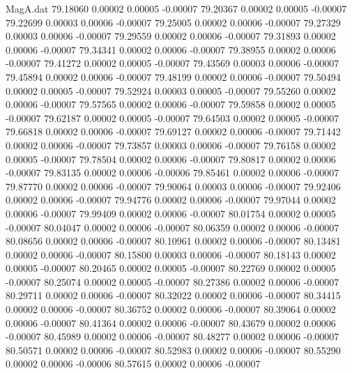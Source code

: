 \begin{filecontents}{MagA.dat}
  79.18060    0.00002    0.00005   -0.00007
  79.20367    0.00002    0.00005   -0.00007
  79.22699    0.00003    0.00006   -0.00007
  79.25005    0.00002    0.00006   -0.00007
  79.27329    0.00003    0.00006   -0.00007
  79.29559    0.00002    0.00006   -0.00007
  79.31893    0.00002    0.00006   -0.00007
  79.34341    0.00002    0.00006   -0.00007
  79.38955    0.00002    0.00006   -0.00007
  79.41272    0.00002    0.00005   -0.00007
  79.43569    0.00003    0.00006   -0.00007
  79.45894    0.00002    0.00006   -0.00007
  79.48199    0.00002    0.00006   -0.00007
  79.50494    0.00002    0.00005   -0.00007
  79.52924    0.00003    0.00005   -0.00007
  79.55260    0.00002    0.00006   -0.00007
  79.57565    0.00002    0.00006   -0.00007
  79.59858    0.00002    0.00005   -0.00007
  79.62187    0.00002    0.00005   -0.00007
  79.64503    0.00002    0.00005   -0.00007
  79.66818    0.00002    0.00006   -0.00007
  79.69127    0.00002    0.00006   -0.00007
  79.71442    0.00002    0.00006   -0.00007
  79.73857    0.00003    0.00006   -0.00007
  79.76158    0.00002    0.00005   -0.00007
  79.78504    0.00002    0.00006   -0.00007
  79.80817    0.00002    0.00006   -0.00007
  79.83135    0.00002    0.00006   -0.00006
  79.85461    0.00002    0.00006   -0.00007
  79.87770    0.00002    0.00006   -0.00007
  79.90064    0.00003    0.00006   -0.00007
  79.92406    0.00002    0.00006   -0.00007
  79.94776    0.00002    0.00006   -0.00007
  79.97044    0.00002    0.00006   -0.00007
  79.99409    0.00002    0.00006   -0.00007
  80.01754    0.00002    0.00005   -0.00007
  80.04047    0.00002    0.00006   -0.00007
  80.06359    0.00002    0.00006   -0.00007
  80.08656    0.00002    0.00006   -0.00007
  80.10961    0.00002    0.00006   -0.00007
  80.13481    0.00002    0.00006   -0.00007
  80.15800    0.00003    0.00006   -0.00007
  80.18143    0.00002    0.00005   -0.00007
  80.20465    0.00002    0.00005   -0.00007
  80.22769    0.00002    0.00005   -0.00007
  80.25074    0.00002    0.00005   -0.00007
  80.27386    0.00002    0.00006   -0.00007
  80.29711    0.00002    0.00006   -0.00007
  80.32022    0.00002    0.00006   -0.00007
  80.34415    0.00002    0.00006   -0.00007
  80.36752    0.00002    0.00006   -0.00007
  80.39064    0.00002    0.00006   -0.00007
  80.41364    0.00002    0.00006   -0.00007
  80.43679    0.00002    0.00006   -0.00007
  80.45989    0.00002    0.00006   -0.00007
  80.48277    0.00002    0.00006   -0.00007
  80.50571    0.00002    0.00006   -0.00007
  80.52983    0.00002    0.00006   -0.00007
  80.55290    0.00002    0.00006   -0.00006
  80.57615    0.00002    0.00006   -0.00007

\end{filecontents}

